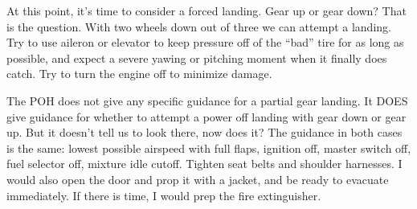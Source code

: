 At this point, it's time to consider a forced landing. Gear up or gear down? That is the question. With two wheels down out of three we can attempt a landing. Try to use aileron or elevator to keep pressure off of the ``bad'' tire for as long as possible, and expect a severe yawing or pitching moment when it finally does catch. Try to turn the engine off to minimize damage.

The POH does not give any specific guidance for a partial gear landing. It DOES give guidance for whether to attempt a power off landing with gear down or gear up. But it doesn't tell us to look there, now does it? The guidance in both cases is the same: lowest possible airspeed with full flaps, ignition off, master switch off, fuel selector off, mixture idle cutoff. Tighten seat belts and shoulder harnesses. I would also open the door and prop it with a jacket, and be ready to evacuate immediately. If there is time, I would prep the fire extinguisher.









